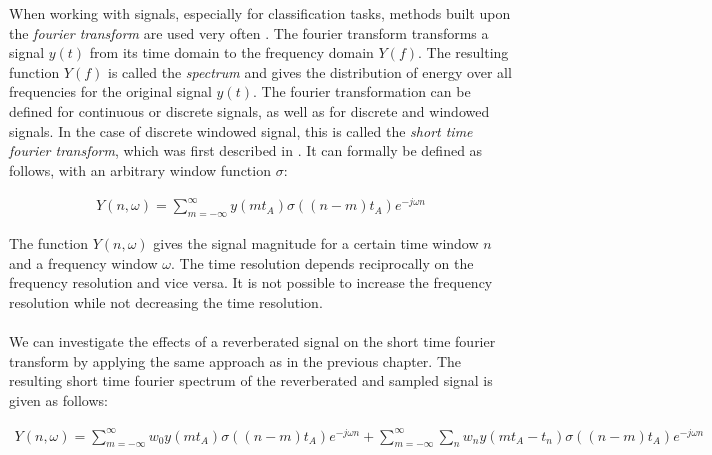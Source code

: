 When working with signals, especially for classification tasks, methods built upon the \textit{fourier transform} are used very often \cite{zhan1997vocal} \cite{davis1990comparison} \cite{kitasr2018stueker}. The fourier transform transforms a signal $y(t)$ from its time domain to the frequency domain $Y(f)$. The resulting function $Y(f)$ is called the \textit{spectrum} and gives the distribution of energy over all frequencies for the original signal $y(t)$. The fourier transformation can be defined for continuous or discrete signals, as well as for discrete and windowed signals. In the case of discrete windowed signal, this is called the \textit{short time fourier transform}, which was first described in \cite{gabor1946theory}. It can formally be defined as follows, with an arbitrary window function $\sigma$:

\begin{align}
Y(n, \omega) = \sum_{m = -\infty}^{\infty} y(mt_A) \sigma((n - m)t_A) e^{-j \omega n}  
\label{eq:stft}
\end{align}

The function $Y(n, \omega)$ gives the signal magnitude for a certain time window $n$ and a frequency window $\omega$. The time resolution depends reciprocally on the frequency resolution and vice versa. It is not possible to increase the frequency resolution while not decreasing the time resolution.\\ \\

We can investigate the effects of a reverberated signal on the short time fourier transform by applying the same approach as in the previous chapter. The resulting short time fourier spectrum of the reverberated and sampled signal is given as follows:

\begin{align}
Y(n, \omega) = \sum_{m = -\infty}^{\infty} w_0 y(mt_A) \sigma((n - m)t_A) e^{-j \omega n} + 
\sum_{m = -\infty}^{\infty} \sum_{n} w_n y(mt_A - t_n) \sigma((n - m)t_A) e^{-j \omega n}  
\label{eq:stftnoise}
\end{align}

